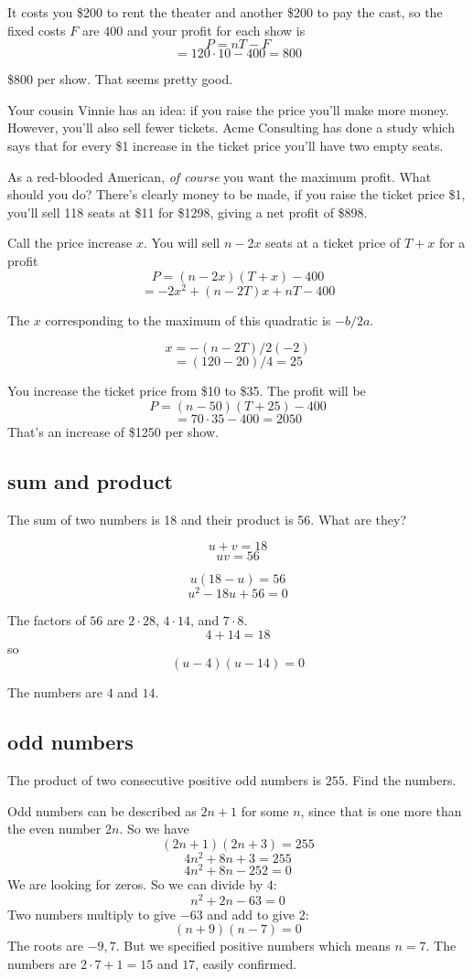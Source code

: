 \documentclass[11pt, oneside]{article}
\begin{document}
It costs you \$200 to rent the theater and another \$200 to pay the cast, so the fixed costs $F$ are $400$ and your profit for each show is
\[ P = nT - F \]
\[ = 120 \cdot 10 - 400 = 800 \]

\$800 per show.  That seems pretty good.

Your cousin Vinnie has an idea:  if you raise the price you'll make more money.  However, you'll also sell fewer tickets.  Acme Consulting has done a study which says that for every \$1 increase in the ticket price you'll have two empty seats.

As a red-blooded American, \emph{of course} you want the maximum profit.  What should you do?  There's clearly money to be made, if you raise the ticket price \$1, you'll sell 118 seats at \$11 for \$1298, giving a net profit of \$898.

Call the price increase $x$.  You will sell $n - 2x$ seats at a ticket price of $T + x$ for a profit
\[ P = (n - 2x)(T + x) - 400 \]
\[ = -2x^2 + (n - 2T)x + nT - 400 \]

The $x$ corresponding to the maximum of this quadratic is $-b/2a$.

\[ x  = -(n - 2T)/2(-2) \]
\[   = (120 - 20)/4 = 25 \]

You increase the ticket price from \$10 to \$35.  The profit will be
\[ P = (n - 50)(T + 25) - 400 \]
\[ = 70 \cdot 35 - 400 = 2050 \]
That's an increase of \$1250 per show.

\subsection*{sum and product}

The sum of two numbers is 18 and their product is 56.  What are they?

\[ u + v = 18 \]
\[ uv = 56 \]

\[ u(18 - u) = 56 \]
\[ u^2 - 18u + 56 = 0 \]

The factors of $56$ are $2 \cdot 28$, $4 \cdot 14$, and $7 \cdot 8$.
\[ 4 + 14 = 18 \]
so
\[ (u - 4)(u - 14) = 0 \]

The numbers are $4$ and $14$.

\subsection*{odd numbers}
The product of two consecutive positive odd numbers is $255$.  Find the numbers.

Odd numbers can be described as $2n+1$ for some $n$, since that is one more than the even number $2n$.  So we have
\[ (2n + 1)(2n + 3) = 255 \]
\[ 4n^2 + 8n + 3 = 255 \]
\[ 4n^2 + 8n - 252 = 0 \]
We are looking for zeros.  So we can divide by $4$:
\[ n^2 + 2n - 63 = 0 \]
Two numbers multiply to give $-63$ and add to give $2$:
\[ (n + 9)(n - 7) = 0 \]
The roots are $-9, 7$.  But we specified positive numbers which means $n = 7$.  The numbers are $2 \cdot 7 + 1 = 15$ and $17$, easily confirmed.
\end{document}

